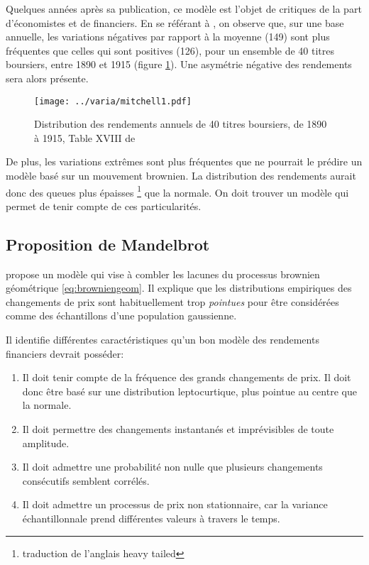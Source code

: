 Quelques années après sa publication, ce modèle est l'objet de
critiques de la part d'économistes et de financiers. En se référant à
\cite{mitchell1916critique}, on observe que, sur une base annuelle,
les variations négatives par rapport à la moyenne (149) sont plus
fréquentes que celles qui sont positives (126), pour un ensemble de 40
titres boursiers, entre 1890 et 1915 (figure \ref{fig:mitchell1}).
Une asymétrie négative des rendements sera alors présente.
\begin{figure}[!ht]
  \centering
  \texttt{[image: ../varia/mitchell1.pdf]}
  \caption{Distribution des rendements annuels de 40 titres boursiers,
    de 1890 à 1915, Table XVIII de \cite{mitchell1916critique}}
  \label{fig:mitchell1}
\end{figure}

De plus, les variations extrêmes sont plus fréquentes que ne pourrait
le prédire un modèle basé sur un mouvement brownien. La distribution
des rendements aurait donc des queues plus épaisses
\footnote{traduction de l'anglais heavy tailed} que la normale. On
doit trouver un modèle qui permet de tenir compte de ces
particularités.

\subsection{Proposition de Mandelbrot}
\label{sec:mandelbrot}


\cite{mandelbrot1963variation} propose un modèle qui vise à combler
les lacunes du processus brownien géométrique
\eqref{eq:browniengeom}. Il explique que les distributions empiriques
des changements de prix sont habituellement trop \emph{pointues} pour
être considérées comme des échantillons d'une population gaussienne.

Il identifie différentes caractéristiques qu'un bon modèle des
rendements financiers devrait posséder:

\begin{enumerate}
  \label{enum:mandelbrot}
\item Il doit tenir compte de la fréquence des grands changements de
  prix. Il doit donc être basé sur une distribution leptocurtique,
  plus pointue au centre que la normale.
\item Il doit permettre des changements instantanés et imprévisibles
  de toute amplitude.
\item Il doit admettre une probabilité non nulle que plusieurs
  changements consécutifs semblent corrélés.
\item Il doit admettre un processus de prix non stationnaire, car la
  variance échantillonnale prend différentes valeurs à travers le
  temps.
\end{enumerate}

